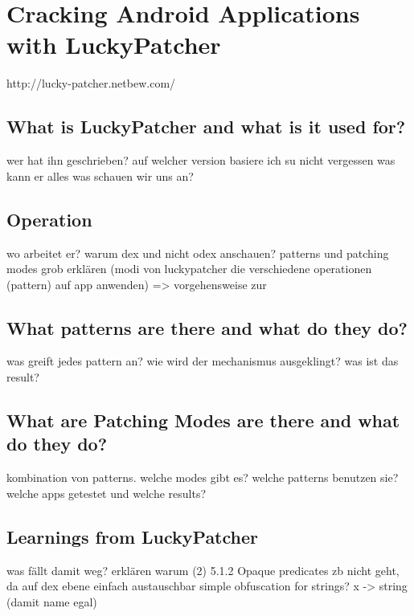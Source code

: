 \chapter{Cracking Android Applications with LuckyPatcher}\label{chapter:luckypatcher}
http://lucky-patcher.netbew.com/

\section{What is LuckyPatcher and what is it used for?}\label{section:luckypatcher-explain}
wer hat ihn geschrieben?\newline
auf welcher version basiere ich\newline
su nicht vergessen\newline
was kann er alles\newline
was schauen wir uns an?

\section{Operation}\label{section:luckypatcher-operation}
wo arbeitet er?\newline
warum dex und nicht odex anschauen?\newline
patterns und patching modes grob erklären (modi von luckypatcher die verschiedene operationen (pattern) auf app anwenden) => vorgehensweise zur

\section{What patterns are there and what do they do?}\label{section:luckypatcher-patterns}
was greift jedes pattern an? wie wird der mechanismus ausgeklingt? was ist das result?

\section{What are Patching Modes are there and what do they do?}\label{section:luckypatcher-modes}
kombination von patterns.\newline
welche modes gibt es? welche patterns benutzen sie?\newline
welche apps getestet und welche results?

\section{Learnings from LuckyPatcher}\label{section:luckypatcher-learnings}
was fällt damit weg?\newline
erklären warum 	(2) 5.1.2 Opaque predicates zb nicht geht, da auf dex ebene einfach austauschbar\newline
simple obfuscation for strings? x -> string (damit name egal)
